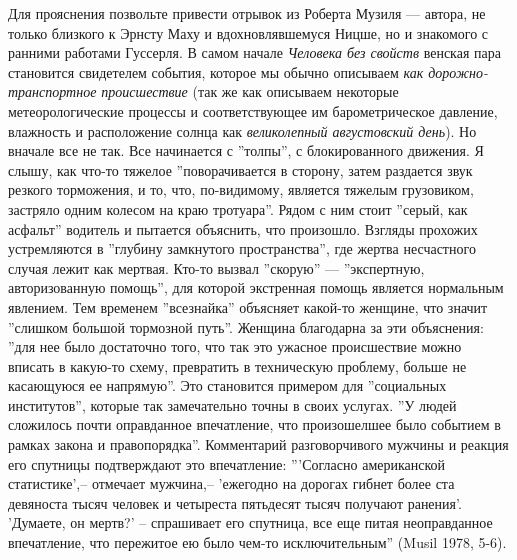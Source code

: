 \documentclass[12pt]{book}
\begin{document}
Для прояснения позвольте привести отрывок из Роберта Музиля --- автора, не только близкого к Эрнсту Маху и вдохновлявшемуся Ницше, но и знакомого с ранними работами Гуссерля. В самом начале \textit{Человека без свойств} венская пара становится свидетелем события, которое мы обычно описываем \textit{как дорожно-транспортное происшествие} (так же как описываем некоторые метеорологические процессы и соответствующее им барометрическое давление, влажность и расположение солнца как \textit{великолепный августовский день}). Но вначале все не так. Все начинается с ''толпы'', с блокированного движения. Я слышу, как что-то тяжелое ''поворачивается в сторону, затем раздается звук резкого торможения, и то, что, по-видимому, является тяжелым грузовиком, застряло одним колесом на краю тротуара''. Рядом с ним стоит ''серый, как асфальт'' водитель и пытается объяснить, что произошло. Взгляды прохожих устремляются в ''глубину замкнутого пространства'', где жертва несчастного случая лежит как мертвая. Кто-то вызвал ''скорую'' --- ''экспертную, авторизованную помощь'', для которой экстренная помощь является нормальным явлением. Тем временем ''всезнайка'' объясняет какой-то женщине, что значит ''слишком большой тормозной путь''. Женщина благодарна за эти объяснения: ''для нее было достаточно того, что так это ужасное происшествие можно вписать в какую-то схему, превратить в техническую проблему, больше не касающуюся ее напрямую''. Это становится примером для ''социальных институтов'', которые так замечательно точны в своих услугах. ''У людей сложилось почти оправданное впечатление, что произошелшее было событием в рамках закона и правопорядка''. Комментарий разговорчивого мужчины и реакция его спутницы подтверждают это впечатление: '''Согласно американской статистике',-- отмечает мужчина,-- 'ежегодно на дорогах гибнет более ста девяноста тысяч человек и четыреста пятьдесят тысяч получают ранения'. 'Думаете, он мертв?' -- спрашивает его спутница, все еще питая неоправданное впечатление, что пережитое ею было чем-то исключительным'' (Musil 1978, 5-6).
\end{document}
